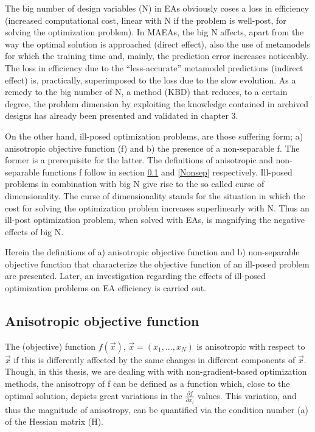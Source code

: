 The big number of design variables (N) in EAs obviously coses a loss in efficiency (increased computational cost, linear with N if the problem is well-post, for solving the optimization problem). In MAEAs, the big N affects, apart from the way the optimal solution is approached (direct effect), also the use of metamodels for which the training time and, mainly, the prediction error increases noticeably. The loss in efficiency due to the ``less-accurate'' metamodel predictions (indirect effect) is, practically, superimposed to the loss due to the slow evolution.  As a remedy to the big number of N, a method (KBD) that reduces,  to a certain degree, the problem dimension by exploiting the knowledge contained in archived designs has already been presented and validated in chapter 3.             

On the other hand, ill-posed optimization problems, are those suffering form; a) anisotropic objective function (f) and b) the presence of a non-separable f. The former is a prerequisite for the latter. The definitions of anisotropic and non-separable functions f follow in section \ref{IllCon} and \ref{Nonsep} respectively. Ill-posed problems in combination with big N give rise to the so called curse of dimensionality. The curse of dimensionality stands for the situation in which the cost for solving the optimization problem increases superlinearly with N.  Thus an ill-post optimization problem, when solved with EAs, is magnifying the negative effects of big N. 

Herein the definitions of a) anisotropic objective function and b) non-separable objective function that characterize the objective function of an ill-posed problem are presented. Later, an investigation regarding the effects of ill-posed optimization problems on EA efficiency is carried out.  

\subsection{Anisotropic objective function}
\label{IllCon}
The (objective) function $f(\vec{x})$, $\vec{x}=(x_1,...,x_N)$  is anisotropic with respect to $\vec{x}$ if this is differently affected by the same changes in different components of $\vec{x}$. Though, in this thesis, we are dealing with with non-gradient-based optimization methods, the anisotropy of f can be defined as a function which, close to the optimal solution, depicts great variations in the $\frac{\partial f}{\partial x_i}$ values. This variation, and thus the magnitude of anisotropy, can be quantified via the condition number (a) of the Hessian matrix (H).


